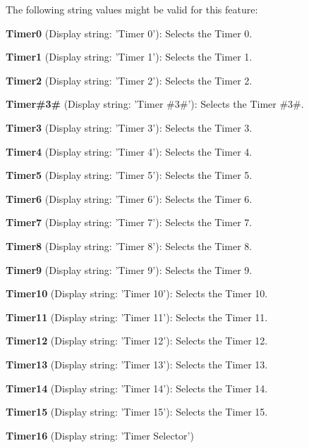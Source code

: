 The following string values might be valid for this feature\+:
\begin{DoxyItemize}
\item {\bfseries Timer0} (Display string\+: 'Timer 0')\+: Selects the Timer 0.
\item {\bfseries Timer1} (Display string\+: 'Timer 1')\+: Selects the Timer 1.
\item {\bfseries Timer2} (Display string\+: 'Timer 2')\+: Selects the Timer 2.
\item {\bfseries Timer\#3\#} (Display string\+: 'Timer \#3\#')\+: Selects the Timer \#3\#.
\item {\bfseries Timer3} (Display string\+: 'Timer 3')\+: Selects the Timer 3.
\item {\bfseries Timer4} (Display string\+: 'Timer 4')\+: Selects the Timer 4.
\item {\bfseries Timer5} (Display string\+: 'Timer 5')\+: Selects the Timer 5.
\item {\bfseries Timer6} (Display string\+: 'Timer 6')\+: Selects the Timer 6.
\item {\bfseries Timer7} (Display string\+: 'Timer 7')\+: Selects the Timer 7.
\item {\bfseries Timer8} (Display string\+: 'Timer 8')\+: Selects the Timer 8.
\item {\bfseries Timer9} (Display string\+: 'Timer 9')\+: Selects the Timer 9.
\item {\bfseries Timer10} (Display string\+: 'Timer 10')\+: Selects the Timer 10.
\item {\bfseries Timer11} (Display string\+: 'Timer 11')\+: Selects the Timer 11.
\item {\bfseries Timer12} (Display string\+: 'Timer 12')\+: Selects the Timer 12.
\item {\bfseries Timer13} (Display string\+: 'Timer 13')\+: Selects the Timer 13.
\item {\bfseries Timer14} (Display string\+: 'Timer 14')\+: Selects the Timer 14.
\item {\bfseries Timer15} (Display string\+: 'Timer 15')\+: Selects the Timer 15.
\item {\bfseries Timer16} (Display string\+: 'Timer Selector')
\end{DoxyItemize}


